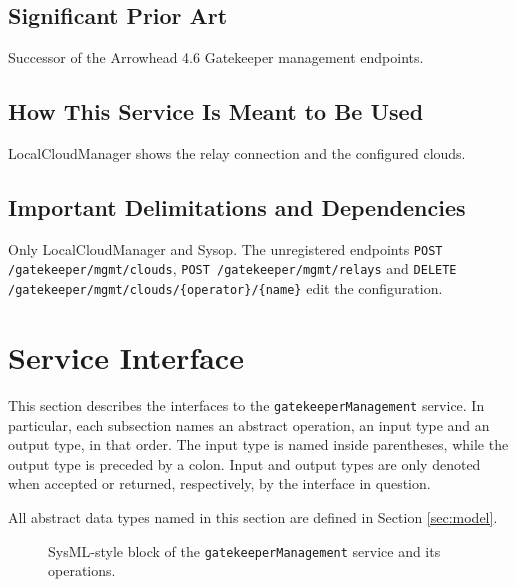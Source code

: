 \documentclass[a4paper]{arrowhead}
\begin{document}
\subsection{Significant Prior Art}

Successor of the Arrowhead 4.6 Gatekeeper management endpoints.

\subsection{How This Service Is Meant to Be Used}

LocalCloudManager shows the relay connection and the configured clouds.

\subsection{Important Delimitations and Dependencies}
\label{sec:delimitations}

Only LocalCloudManager and Sysop. The unregistered endpoints \texttt{POST /\allowbreak{}gatekeeper/\allowbreak{}mgmt/\allowbreak{}clouds}, \texttt{POST /\allowbreak{}gatekeeper/\allowbreak{}mgmt/\allowbreak{}relays} and \texttt{DELETE /\allowbreak{}gatekeeper/\allowbreak{}mgmt/\allowbreak{}clouds/\allowbreak{}\{operator\}/\allowbreak{}\{name\}} edit the configuration.

\newpage

\section{Service Interface}
\label{sec:operations}

This section describes the interfaces to the \texttt{gatekeeper\allowbreak{}Management} service.
In particular, each subsection names an abstract operation, an input type and an output type, in that order.
The input type is named inside parentheses, while the output type is preceded by a colon.
Input and output types are only denoted when accepted or returned, respectively, by the interface in question.

All abstract data types named in this section are defined in Section \ref{sec:model}.

\begin{figure}[ht!]
  \centering
  \caption{SysML-style block of the \texttt{gatekeeper\allowbreak{}Management} service and its operations.}
  \label{fig:SD}
\end{figure}
\end{document}
